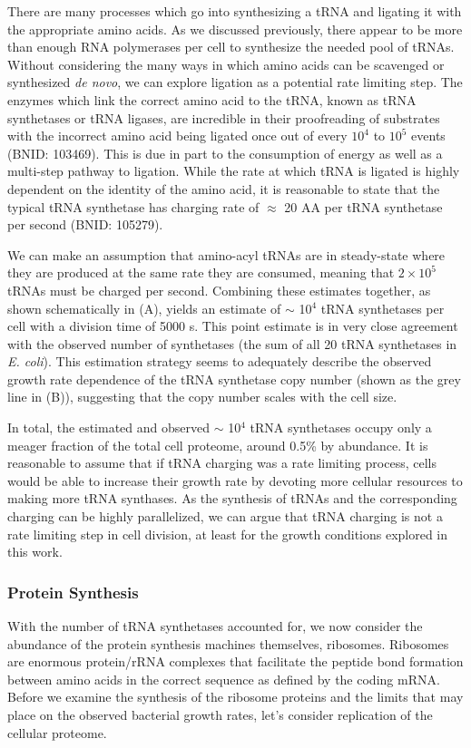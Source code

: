 There are many processes which go into synthesizing a tRNA and ligating it
with the appropriate amino acids. As we discussed previously, there appear to
be more than enough RNA polymerases per cell to synthesize the needed pool of
tRNAs. Without considering the many ways in which amino acids can be
scavenged or synthesized \textit{de novo}, we can explore ligation as a
potential rate limiting step. The enzymes which link the correct amino acid
to the tRNA, known as tRNA synthetases or tRNA ligases, are incredible in
their proofreading of substrates with the incorrect amino acid being ligated
once out of every $10^4$ to $10^5$ events (BNID: 103469).
This is due in part to the consumption of energy as well as a multi-step
pathway to ligation. While the rate at which tRNA is ligated is highly
dependent on the identity of the amino acid, it is reasonable to state that
the typical tRNA synthetase has charging rate of $\approx$ 20 AA per tRNA
synthetase per second (BNID: 105279).

We can make an assumption that amino-acyl tRNAs are in steady-state where they
are produced at the same rate they are consumed, meaning that $2 \times 10^5$
tRNAs must be charged per second. Combining these estimates together, as shown schematically
in (A), yields an estimate of $\sim$ 10$^4$ tRNA
synthetases per cell with a division time of 5000 s. This point estimate is in
very close agreement with the observed number of synthetases (the sum of all 20
tRNA synthetases in \textit{E. coli}). This estimation strategy seems to
adequately describe the observed growth rate dependence of the tRNA synthetase copy
number (shown as the grey line in (B)), suggesting that
the copy number scales with the cell size.

In total, the estimated and observed $\sim$ 10$^4$ tRNA synthetases occupy
only a meager fraction of the total cell proteome, around 0.5\% by abundance. It
is reasonable to assume that if tRNA charging was a rate limiting process, cells
would be able to increase their growth rate by devoting more cellular resources
to making more tRNA synthases. As the synthesis of tRNAs and the corresponding
charging can be highly parallelized, we can argue that tRNA charging is not a
rate limiting step in cell division, at least for the growth conditions explored
in this work.

\subsubsection{Protein Synthesis}
With the number of tRNA synthetases accounted for, we now consider the abundance
of the protein synthesis machines themselves, ribosomes. Ribosomes are enormous
protein/rRNA complexes that facilitate the peptide bond formation between amino
acids in the correct sequence as defined by the coding mRNA. Before we examine
the synthesis of the ribosome proteins and the limits that may place on the
observed bacterial growth rates, let's consider replication of the cellular
proteome.

